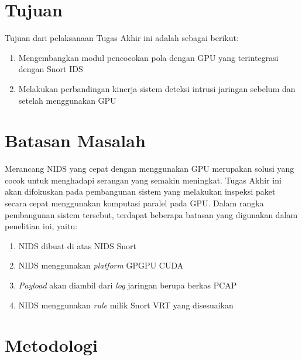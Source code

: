 \section{Tujuan}

  Tujuan dari pelaksanaan Tugas Akhir ini adalah sebagai berikut:
  \begin{enumerate}
      \item Mengembangkan modul pencocokan pola dengan GPU yang terintegrasi dengan Snort IDS
      \item Melakukan perbandingan kinerja sistem deteksi intrusi jaringan sebelum dan setelah menggunakan GPU
  \end{enumerate}

\section{Batasan Masalah}

  Merancang NIDS yang cepat dengan menggunakan GPU merupakan solusi yang cocok untuk menghadapi serangan yang semakin meningkat. Tugas Akhir ini akan difokuskan pada pembangunan sistem yang melakukan inspeksi paket secara cepat menggunakan komputasi paralel pada GPU. Dalam rangka pembangunan sistem tersebut, terdapat beberapa batasan yang digunakan dalam penelitian ini, yaitu:
  \begin{enumerate}
      \item NIDS dibuat di atas NIDS Snort
      \item NIDS menggunakan \emph{platform} GPGPU CUDA
      \item \emph{Payload} akan diambil dari \emph{log} jaringan berupa berkas PCAP
      \item NIDS menggunakan \emph{rule} milik Snort VRT yang disesuaikan
  \end{enumerate}

\section{Metodologi}

